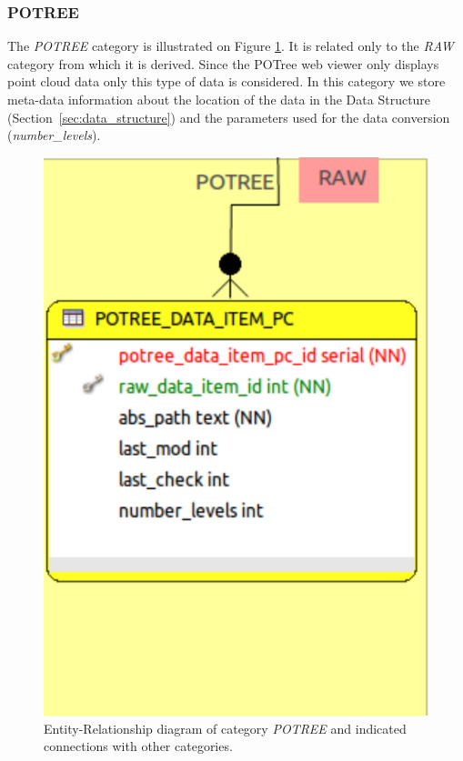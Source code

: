 \subsubsection{POTREE}
The {\em POTREE} category is illustrated on Figure \ref{fig:db_erdb_potree}. It
is related only to the {\em RAW} category from which it is derived. Since the POTree web viewer only displays point cloud data only this type of data is considered. In this category we store meta-data information about the location of the data in the Data Structure (Section~\ref{sec:data_structure}) and the parameters used for the data conversion ({\em number\_levels}).

\begin{figure}[H]
\centering
\includegraphics[scale=0.35]{fig/database/ERDB_POTREE_conn.pdf}
\caption{Entity-Relationship diagram of category {\em POTREE} and indicated
connections with other categories.}
\label{fig:db_erdb_potree}
\end{figure}

